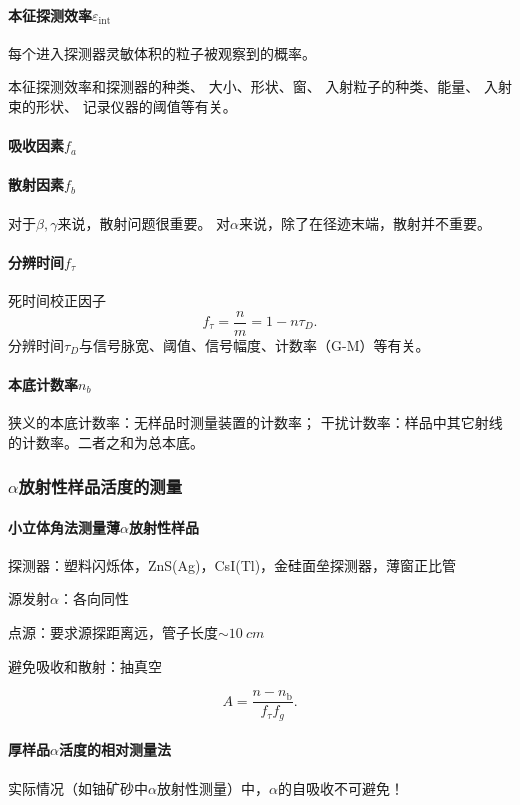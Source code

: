\paragraph{本征探测效率$\varepsilon_{\mathrm{int}}$}
每个进入探测器灵敏体积的粒子被观察到的概率。

本征探测效率和探测器的种类、
大小、形状、窗、
入射粒子的种类、能量、
入射束的形状、
记录仪器的阈值等有关。
\paragraph{吸收因素$f_a$}
\paragraph{散射因素$f_b$}
对于$\beta,\gamma$来说，散射问题很重要。
对$\alpha$来说，除了在径迹末端，散射并不重要。
\paragraph{分辨时间$f_\tau$}
死时间校正因子
\[
	f_\tau=\frac nm=1-n\tau_D.
\]
分辨时间$\tau_D$与信号脉宽、阈值、信号幅度、计数率（G-M）等有关。
\paragraph{本底计数率$n_b$}
狭义的本底计数率：无样品时测量装置的计数率；
干扰计数率：样品中其它射线的计数率。二者之和为总本底。
\subsubsection[\textit{\textalpha}放射性样品活度的测量]{$\alpha$放射性样品活度的测量}
\paragraph{小立体角法测量薄$\alpha$放射性样品}
\begin{compactitem}
	\item 探测器：塑料闪烁体，ZnS(Ag)，CsI(Tl)，金硅面垒探测器，薄窗正比管
	\item 源发射$\alpha$：各向同性
	\item 点源：要求源探距离远，管子长度$\sim\SI{10}{cm}$
	\item 避免吸收和散射：抽真空
\end{compactitem}
\[
	A=\frac{n-n_\mathrm b}{f_\tau f_g}.
\]
\paragraph{厚样品$\alpha$活度的相对测量法}
实际情况（如铀矿砂中$\alpha$放射性测量）中，$\alpha$的自吸收不可避免！
